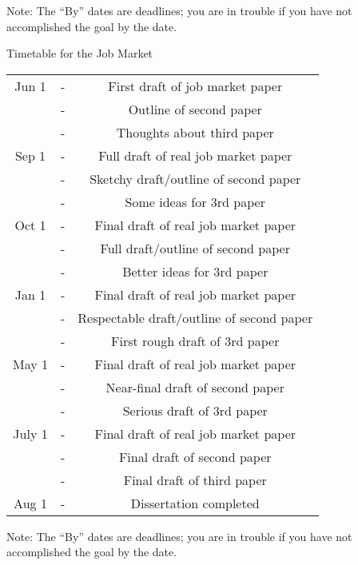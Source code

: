 \documentclass{econtex}
\begin{document}
Note: The ``By'' dates are deadlines; you are in trouble if you have not
accomplished the goal by the date.


\vfill\eject\pagebreak
\centerline{\LARGE Timetable for the Job Market}

\begin{center}
\begin{tabular}{|ccc|}\hline
     Jun 1 & - & First draft of job market paper
\\       & - & Outline of second paper
\\       & - & Thoughts about third paper
\\   Sep 1 & - & Full draft of real job market paper
\\     & - & Sketchy draft/outline of second paper
\\     & - & Some ideas for 3rd paper
\\ Oct 1 & - & Final draft of real job market paper
\\     & - & Full draft/outline of second paper
\\     & - & Better ideas for 3rd paper
\\ Jan 1 & - & Final draft of real job market paper
\\     & - & Respectable draft/outline of second paper
\\     & - & First rough draft of 3rd paper
\\ May 1 & - & Final draft of real job market paper
\\     & - & Near-final draft of second paper
\\     & - & Serious draft of 3rd paper
\\ July 1 & - & Final draft of real job market paper
\\     & - & Final draft of second paper
\\     & - & Final draft of third paper
\\ Aug 1 & - & Dissertation completed
\\ \hline 
\end{tabular}
\end{center}



Note: The ``By'' dates are deadlines; you are in trouble if you have not
accomplished the goal by the date.
\end{document}
